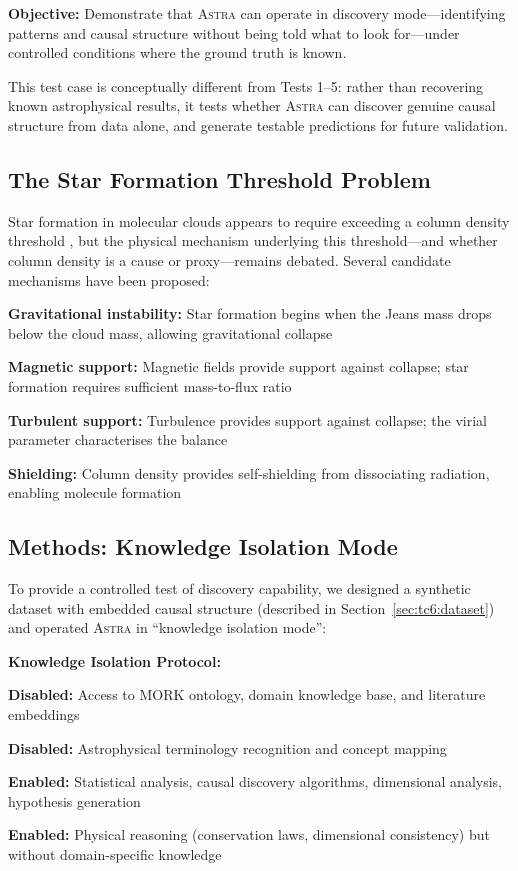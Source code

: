 \documentclass[usenatbib]{rasti}
\newcommand{\astra}{\textsc{Astra}\xspace}
\begin{document}
\textbf{Objective:} Demonstrate that \astra can operate in discovery mode---identifying patterns and causal structure without being told what to look for---under controlled conditions where the ground truth is known.

This test case is conceptually different from Tests 1--5: rather than recovering known astrophysical results, it tests whether \astra can discover genuine causal structure from data alone, and generate testable predictions for future validation.

\subsection{The Star Formation Threshold Problem}
\label{sec:tc6:problem}

Star formation in molecular clouds appears to require exceeding a column density threshold \citep{Andre2010}, but the physical mechanism underlying this threshold---and whether column density is a cause or proxy---remains debated.
Several candidate mechanisms have been proposed:
\begin{description}
  \item \textbf{Gravitational instability:} Star formation begins when the Jeans mass drops below the cloud mass, allowing gravitational collapse
  \item \textbf{Magnetic support:} Magnetic fields provide support against collapse; star formation requires sufficient mass-to-flux ratio
  \item \textbf{Turbulent support:} Turbulence provides support against collapse; the virial parameter characterises the balance
  \item \textbf{Shielding:} Column density provides self-shielding from dissociating radiation, enabling molecule formation
\end{description}

\subsection{Methods: Knowledge Isolation Mode}
\label{sec:tc6:methods}

To provide a controlled test of discovery capability, we designed a synthetic dataset with embedded causal structure (described in Section~\ref{sec:tc6:dataset}) and operated \astra in ``knowledge isolation mode'':

\textbf{Knowledge Isolation Protocol:}
\begin{description}
  \item \textbf{Disabled:} Access to MORK ontology, domain knowledge base, and literature embeddings
  \item \textbf{Disabled:} Astrophysical terminology recognition and concept mapping
  \item \textbf{Enabled:} Statistical analysis, causal discovery algorithms, dimensional analysis, hypothesis generation
  \item \textbf{Enabled:} Physical reasoning (conservation laws, dimensional consistency) but without domain-specific knowledge
\end{description}
\end{document}
